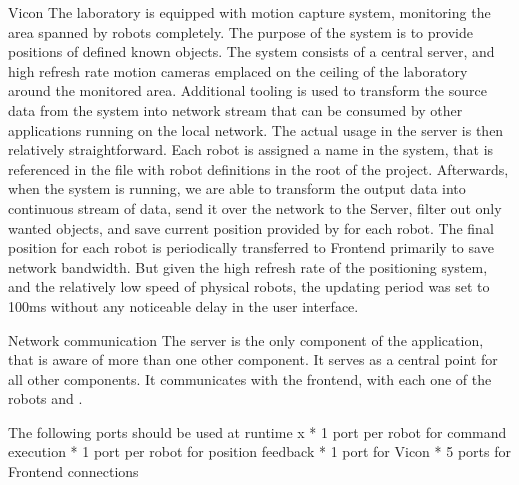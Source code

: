 \secc Vicon
The laboratory is equipped with {\vicon} motion capture system, monitoring the area spanned by robots completely. The purpose of the system is to provide positions of defined known objects.\br
The system consists of a central server, and high refresh rate motion cameras emplaced on the ceiling of the laboratory around the monitored area. Additional tooling is used to transform the source data from the {\vicon} system into network stream that can be consumed by other applications running on the local network.\br
The actual usage in the server is then relatively straightforward. Each robot is assigned a name in the {\vicon} system, that is referenced in the file with robot definitions in the root of the project. Afterwards, when the {\vicon} system is running, we are able to transform the output data into continuous stream of data, send it over the network to the Server, filter out only wanted objects, and save current position provided by {\vicon} for each robot. The final position for each robot is periodically transferred to Frontend primarily to save network bandwidth. But given the high refresh rate of the positioning system, and the relatively low speed of physical robots, the updating period was set to 100ms without any noticeable delay in the user interface.

\secc Network communication
The server is the only component of the application, that is aware of more than one other component. It serves as a central point for all other components. It communicates with the frontend, with each one of the robots and {\vicon}.

The following ports should be used at runtime
\begitems \style x
    * 1 port per robot for command execution
    * 1 port per robot for position feedback
    * 1 port for Vicon
    * 5 ports for Frontend connections
\enditems


